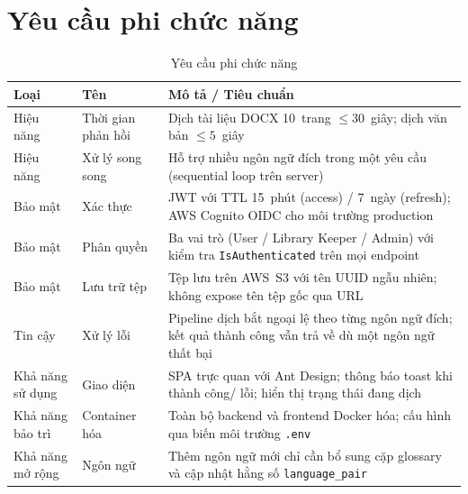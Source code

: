 \section{Yêu cầu phi chức năng}

\begin{table}[H]
\centering
\caption{Yêu cầu phi chức năng}
\label{tab:nonfunc}
\renewcommand{\arraystretch}{1.3}
\begin{tabularx}{\textwidth}{|l|l|X|}
\hline
\textbf{Loại}       & \textbf{Tên}          & \textbf{Mô tả / Tiêu chuẩn} \\
\hline
Hiệu năng           & Thời gian phản hồi    & Dịch tài liệu DOCX 10~trang $\leq 30$~giây; dịch văn bản
                                              $\leq 5$~giây \\
\hline
Hiệu năng           & Xử lý song song       & Hỗ trợ nhiều ngôn ngữ đích trong một yêu cầu (sequential loop
                                              trên server) \\
\hline
Bảo mật             & Xác thực              & JWT với TTL 15~phút (access) / 7~ngày (refresh); AWS Cognito
                                              OIDC cho môi trường production \\
\hline
Bảo mật             & Phân quyền            & Ba vai trò (User / Library Keeper / Admin) với kiểm tra
                                              \texttt{IsAuthenticated} trên mọi endpoint \\
\hline
Bảo mật             & Lưu trữ tệp           & Tệp lưu trên AWS~S3 với tên UUID ngẫu nhiên; không expose
                                              tên tệp gốc qua URL \\
\hline
Tin cậy             & Xử lý lỗi            & Pipeline dịch bắt ngoại lệ theo từng ngôn ngữ đích; kết quả
                                              thành công vẫn trả về dù một ngôn ngữ thất bại \\
\hline
Khả năng sử dụng    & Giao diện             & SPA trực quan với Ant Design; thông báo toast khi thành công/
                                              lỗi; hiển thị trạng thái đang dịch \\
\hline
Khả năng bảo trì    & Container hóa         & Toàn bộ backend và frontend Docker hóa; cấu hình qua biến
                                              môi trường \texttt{.env} \\
\hline
Khả năng mở rộng    & Ngôn ngữ              & Thêm ngôn ngữ mới chỉ cần bổ sung cặp glossary và cập nhật
                                              hằng số \texttt{language\_pair} \\
\hline
\end{tabularx}
\end{table}

